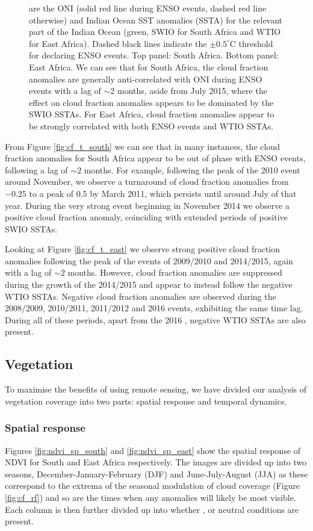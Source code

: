 \begin{figure}
{    are the ONI (solid red line during ENSO events, dashed red line
    otherwise) and Indian Ocean SST anomalies (SSTA) for the relevant
    part of the Indian Ocean (green, SWIO for South Africa and WTIO
    for East Africa). Dashed black lines indicate the $\pm0.5^{\circ}$C
    threshold for declaring ENSO events. Top panel: South
    Africa. Bottom panel: East Africa. We can see that for South
    Africa, the cloud fraction anomalies are generally anti-correlated
    with ONI during ENSO events with a lag of ${\sim}2$ months, aside from
    July 2015, where the effect on cloud fraction anomalies appears to
    be dominated by the SWIO SSTAs. For East Africa, cloud fraction
    anomalies appear to be strongly correlated with both ENSO events
    and WTIO SSTAs.}
  \label{fig:cf_temporal}
\end{figure}

From Figure \ref{fig:cf_t_south} we can see that in many instances, the
cloud fraction anomalies for South Africa appear to be out of phase
with ENSO events, following a lag of ${\sim}2$ months. For example,
following the peak of the 2010 \nina{} event around November, we
observe a turnaround of cloud fraction anomalies from $-0.25$ to a
peak of $0.5$ by March 2011, which persists until around July of that
year. During the very strong \elnino{} event beginning in November
2014 we observe a positive cloud fraction anomaly, coinciding with
extended periods of positive SWIO SSTAs.

Looking at Figure \ref{fig:cf_t_east} we observe strong positive cloud
fraction anomalies following the peak of the \elnino{} events of
2009/2010 and 2014/2015, again with a lag of ${\sim}2$ months. However,
cloud fraction anomalies are suppressed during the growth of the
2014/2015 \elnino{} and appear to instead follow the negative WTIO
SSTAs. Negative cloud fraction anomalies are observed during the
2008/2009, 2010/2011, 2011/2012 and 2016 \nina{} events, exhibiting
the same time lag. During all of these periods, apart from the 2016
\nina{}, negative WTIO SSTAs are also present.

\subsection{Vegetation}
To maximise the benefits of using remote sensing, we have divided our
analysis of vegetation coverage into two parts: spatial response and
temporal dynamics.

\subsubsection{Spatial response}
Figures \ref{fig:ndvi_sp_south} and \ref{fig:ndvi_sp_east} show the
spatial response of NDVI for South and East Africa respectively. The
images are divided up into two seasons, December-January-February
(DJF) and June-July-August (JJA) as these correspond to the extrema of
the seasonal modulation of cloud coverage (Figure \ref{fig:cf_rf}) and
so are the times when any anomalies will likely be most visible. Each
column is then further divided up into whether \elnino{}, \nina{} or
neutral conditions are present.

